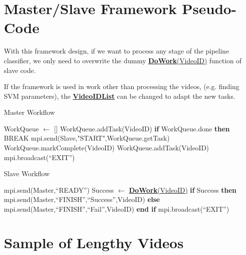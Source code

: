 \documentclass[bsc,logo,twoside,fullspacing,parskip]{infthesis}
\begin{document}
\begin{appendices}

\chapter{Master/Slave Framework Pseudo-Code}
\label{apped:msf}

With this framework design, if we want to process any stage of the pipeline classifier, we only need to overwrite the dummy \underline{\textbf{DoWork}(VideoID)} function of slave code.

If the framework is used in work other than processing the videos, (e.g. finding SVM parameters), the  \underline{\textbf{VideoIDList}} can be changed to adapt the new tasks.

\begin{algorithm}
\caption{Master Workflow}
\begin{algorithmic}
\STATE WorkQueue $\leftarrow$ []
	\STATE WorkQueue.addTask(VideoID)
\ENDFOR
{}
		\STATE \textbf{if} WorkQueue.done \textbf{then} BREAK 
		\STATE mpi.send(Slave,"START",WorkQueue.getTask)
	\ENDFOR
		\STATE WorkQueue.markComplete(VideoID)
			\STATE WorkQueue.addTask(VideoID)
		\ENDIF
	\ENDFOR
\ENDWHILE
\STATE mpi.broadcast(``EXIT'')
\end{algorithmic} 
\end{algorithm}

\begin{algorithm}
\caption{Slave Workflow}
\begin{algorithmic}
	\STATE mpi.send(Master,``READY'')
		\STATE Success $\leftarrow$ \underline{\textbf{DoWork}(VideoID)}
		\STATE \textbf{if} Success \textbf{then}
		\STATE \hspace{10pt}mpi.send(Master,``FINISH'',``Success'',VideoID)
		\STATE \textbf{else}
		\STATE \hspace{10pt}mpi.send(Master,``FINISH'',``Fail'',VideoID)
		\STATE \textbf{end if}
	\ENDIF
\ENDWHILE
\STATE mpi.broadcast(``EXIT'')
\end{algorithmic} 
\end{algorithm}

\chapter{Sample of Lengthy Videos}
\label{append:samplelong}


\end{appendices}
\end{document}
